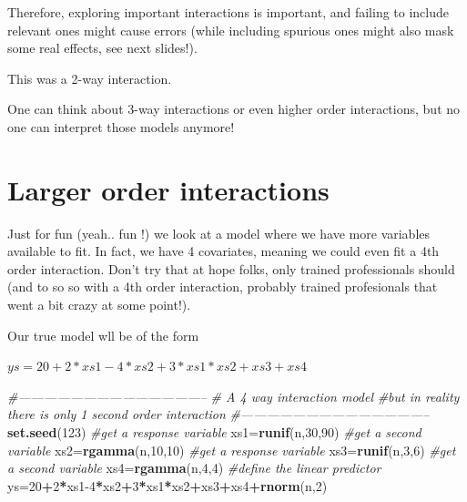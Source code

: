 \documentclass[
]{book}
\newenvironment{Shaded}{\begin{snugshade}}{\end{snugshade}}
\newcommand{\CommentTok}[1]{\textcolor[rgb]{0.56,0.35,0.01}{\textit{#1}}}
\newcommand{\DecValTok}[1]{\textcolor[rgb]{0.00,0.00,0.81}{#1}}
\newcommand{\KeywordTok}[1]{\textcolor[rgb]{0.13,0.29,0.53}{\textbf{#1}}}
\newcommand{\NormalTok}[1]{#1}
\newcommand{\OperatorTok}[1]{\textcolor[rgb]{0.81,0.36,0.00}{\textbf{#1}}}
\begin{document}
Therefore, exploring important interactions is important, and failing to include relevant ones might cause errors (while including spurious ones might also mask some real effects, see next slides!).

This was a 2-way interaction.

One can think about 3-way interactions or even higher order interactions, but no one can interpret those models anymore!

\hypertarget{larger-order-interactions}{%
\section{Larger order interactions}\label{larger-order-interactions}}

Just for fun (yeah.. fun !) we look at a model where we have more variables available to fit. In fact, we have 4 covariates, meaning we could even fit a 4th order interaction. Don't try that at hope folks, only trained professionals should (and to so so with a 4th order interaction, probably trained profesionals that went a bit crazy at some point!).

Our true model wll be of the form

\(ys=20+2*xs1-4*xs2+3*xs1*xs2+xs3+xs4\)

\begin{Shaded}
\begin{Highlighting}[]
\CommentTok{#--------------------------------------------}
\CommentTok{# A 4 way interaction model}
\CommentTok{#but in reality there is only 1 second order interaction}
\CommentTok{#--------------------------------------------}
\KeywordTok{set.seed}\NormalTok{(}\DecValTok{123}\NormalTok{)}
\CommentTok{#get a response variable}
\NormalTok{xs1=}\KeywordTok{runif}\NormalTok{(n,}\DecValTok{30}\NormalTok{,}\DecValTok{90}\NormalTok{)}
\CommentTok{#get a second variable}
\NormalTok{xs2=}\KeywordTok{rgamma}\NormalTok{(n,}\DecValTok{10}\NormalTok{,}\DecValTok{10}\NormalTok{)}
\CommentTok{#get a response variable}
\NormalTok{xs3=}\KeywordTok{runif}\NormalTok{(n,}\DecValTok{3}\NormalTok{,}\DecValTok{6}\NormalTok{)}
\CommentTok{#get a second variable}
\NormalTok{xs4=}\KeywordTok{rgamma}\NormalTok{(n,}\DecValTok{4}\NormalTok{,}\DecValTok{4}\NormalTok{)}
\CommentTok{#define the linear predictor}
\NormalTok{ys=}\DecValTok{20}\OperatorTok{+}\DecValTok{2}\OperatorTok{*}\NormalTok{xs1}\DecValTok{-4}\OperatorTok{*}\NormalTok{xs2}\OperatorTok{+}\DecValTok{3}\OperatorTok{*}\NormalTok{xs1}\OperatorTok{*}\NormalTok{xs2}\OperatorTok{+}\NormalTok{xs3}\OperatorTok{+}\NormalTok{xs4}\OperatorTok{+}\KeywordTok{rnorm}\NormalTok{(n,}\DecValTok{2}\NormalTok{)}
\end{Highlighting}
\end{Shaded}
\end{document}

